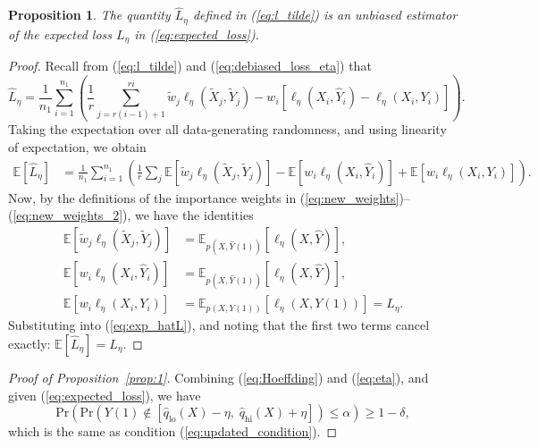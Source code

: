 \documentclass{article}
\theoremstyle{plain}
\newtheorem{proposition}[theorem]{Proposition}
\theoremstyle{definition}
\theoremstyle{remark}
\begin{document}
\begin{proposition}
    The quantity \( \hat{L}_\eta \) defined in (\ref{eq:l_tilde}) is an unbiased estimator of the expected loss \( L_\eta \) in (\ref{eq:expected_loss}).
\end{proposition}
\begin{proof}
    Recall from (\ref{eq:l_tilde}) and (\ref{eq:debiased_loss_eta}) that
    \[
    \hat{L}_\eta = \frac{1}{n_1} \sum_{i=1}^{n_1} \left( \frac{1}{r} \sum_{j=r(i-1)+1}^{ri} \tilde{w}_j \ell_\eta(\tilde{X}_j, \tilde{Y}_j)
    - w_i \left[\ell_\eta(X_i, \hat{Y}_i) - \ell_\eta(X_i, Y_i)\right] \right).
    \]
    Taking the expectation over all data-generating randomness, and using linearity of expectation, we obtain
    \begin{align}
        \mathbb{E}[\hat{L}_\eta] &= \frac{1}{n_1} \sum_{i=1}^{n_1} \left( \frac{1}{r} \sum_{j} \mathbb{E}\left[\tilde{w}_j \ell_\eta(\tilde{X}_j, \tilde{Y}_j)\right]
        - \mathbb{E}\left[w_i \ell_\eta(X_i, \hat{Y}_i)\right]
        + \mathbb{E}\left[w_i \ell_\eta(X_i, Y_i)\right] \right). \label{eq:exp_hatL}
    \end{align}
    Now, by the definitions of the importance weights in (\ref{eq:new_weights})--(\ref{eq:new_weights_2}), we have the identities
    \begin{align}
        \mathbb{E}\left[\tilde{w}_j \ell_\eta(\tilde{X}_j, \tilde{Y}_j)\right] &= \mathbb{E}_{p(X, \hat{Y}(1))} \left[\ell_\eta(X, \hat{Y})\right], \\
        \mathbb{E}\left[w_i \ell_\eta(X_i, \hat{Y}_i)\right] &= \mathbb{E}_{ p(X, \hat{Y}(1))} \left[\ell_\eta(X, \hat{Y})\right], \\
        \mathbb{E}\left[w_i \ell_\eta(X_i, Y_i)\right] &= \mathbb{E}_{p(X, Y(1))} \left[\ell_\eta(X, Y(1))\right] = L_\eta.
    \end{align}
    Substituting into (\ref{eq:exp_hatL}), and noting that the first two terms cancel exactly: $\mathbb{E}[\hat{L}_\eta] = L_\eta$. \qedhere
\end{proof}


\begin{proof}[Proof of Proposition~\ref{prop:1}]
Combining (\ref{eq:Hoeffding}) and (\ref{eq:eta}), and given (\ref{eq:expected_loss}), we have
\begin{equation}
    \mathrm{Pr} \left( \mathrm{Pr}\left( Y(1) \notin [\hat{q}_{\text{lo}}(X) - \eta,\; \hat{q}_{\text{hi}}(X) + \eta]  \right) \leq \alpha \right) \geq 1 - \delta,
\end{equation}
which is the same as condition (\ref{eq:updated_condition}).
\end{proof}
\end{document}

